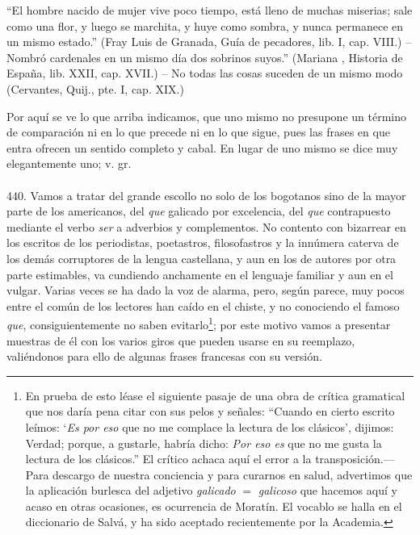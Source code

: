 \documentclass{book}
\begin{document}
“El hombre nacido de mujer vive poco tiempo, está lleno de muchas miserias; sale como una flor, y luego se 
marchita, y huye como sombra, y nunca permanece en un mismo estado.” (Fray Luis de Granada, Guía de pecadores, 
lib. I, cap. VIII.) – Nombró cardenales en un mismo día dos sobrinos suyos.” (Mariana , Historia de España, lib. 
XXII, cap. XVII.) – No todas las cosas suceden de un mismo modo (Cervantes, Quij., pte. I, cap. XIX.)

Por aquí se ve lo que arriba indicamos, que uno mismo no presupone un término de comparación ni en lo que 
precede ni en lo que sigue, pues las frases en que entra ofrecen un sentido completo y cabal.
En lugar de uno mismo se dice muy elegantemente uno; v. gr.

\paragraph{} 440. Vamos a tratar del grande escollo no solo de los bogotanos sino de la mayor 
parte de los americanos, del \emph{que} galicado por excelencia, del \emph{que} contrapuesto mediante el 
verbo \emph{ser} a adverbios y complementos. No contento con bizarrear en los escritos de los periodistas, 
poetastros, filosofastros y la innúmera caterva de los demás corruptores de la lengua 
castellana, y aun en los de autores por otra parte estimables, va cundiendo anchamente en el 
lenguaje familiar y aun en el vulgar. Varias veces se ha dado la voz de alarma, pero, según 
parece, muy pocos entre el común de los lectores han caído en el chiste, y no conociendo el famoso 
\emph{que}, consiguientemente no saben evitarlo\footnote{En prueba de esto léase el siguiente pasaje de
una obra de crítica gramatical que nos daría pena citar con sus pelos y señales: ``Cuando en cierto
escrito leímos: `\emph{Es por eso} que no me complace la lectura de los clásicos', dijimos: Verdad; 
porque, a gustarle, habría dicho: \emph{Por eso es} que no me gusta la lectura de los clásicos.'' El 
crítico achaca aquí el error a la transposición.---Para descargo de nuestra conciencia y para curarnos en 
salud, advertimos que la aplicación burlesca del adjetivo \emph{galicado} $=$ \emph{galicoso} que hacemos 
aquí y acaso en otras ocasiones, es ocurrencia de Moratín. El vocablo se halla en el diccionario de 
Salvá, y ha sido aceptado recientemente por la Academia.}; por este motivo vamos a presentar muestras de 
él 
con los varios giros que pueden usarse en su reemplazo, valiéndonos para ello de algunas frases 
francesas con su versión.
\\
\end{document}
